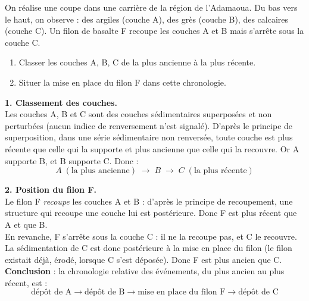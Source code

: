 \documentclass[11pt]{article}
\newcommand{\cle}[1]{{\popxbold\color{popdark}#1}}
\begin{document}
\begin{exoresolu}
On réalise une coupe dans une carrière de la région de l'Adamaoua. Du bas vers le haut, on observe : des argiles (couche A), des grès (couche B), des calcaires (couche C). Un filon de basalte F recoupe les couches A et B mais s'arrête sous la couche C.
\begin{enumerate}
\item Classer les couches A, B, C de la plus ancienne à la plus récente.
\item Situer la mise en place du filon F dans cette chronologie.
\end{enumerate}
\tcblower
\textbf{1. Classement des couches.}\\
Les couches A, B et C sont des couches sédimentaires superposées et non perturbées (aucun indice de renversement n'est signalé). D'après le \cle{principe de superposition}, dans une série sédimentaire non renversée, toute couche est plus récente que celle qui la supporte et plus ancienne que celle qui la recouvre. Or A supporte B, et B supporte C. Donc :
\[ A \;(\text{la plus ancienne}) \;\longrightarrow\; B \;\longrightarrow\; C \;(\text{la plus récente}) \]

\textbf{2. Position du filon F.}\\
Le filon F \emph{recoupe} les couches A et B : d'après le \cle{principe de recoupement}, une structure qui recoupe une couche lui est postérieure. Donc F est plus récent que A et que B.\\
En revanche, F s'arrête sous la couche C : il ne la recoupe pas, et C le recouvre. La sédimentation de C est donc postérieure à la mise en place du filon (le filon existait déjà, érodé, lorsque C s'est déposée). Donc F est plus ancien que C.\\
\textbf{Conclusion} : la chronologie relative des événements, du plus ancien au plus récent, est :
\[ \text{dépôt de A} \rightarrow \text{dépôt de B} \rightarrow \text{mise en place du filon F} \rightarrow \text{dépôt de C} \]
\end{exoresolu}
\end{document}
